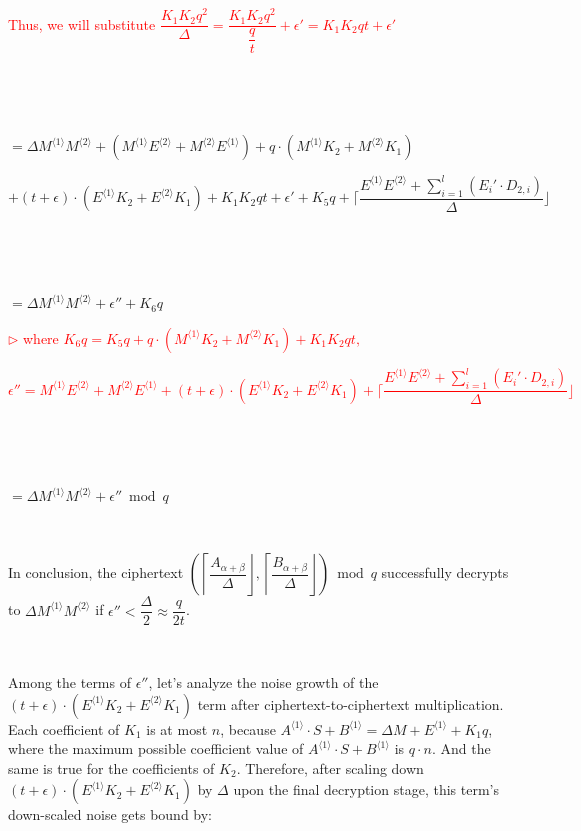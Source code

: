 \text{ } \text{ }  \textcolor{red}{ Thus, we will substitute $\dfrac{K_1K_2q^2}{\Delta} = \dfrac{K_1K_2q^2}{\dfrac{q}{t}} + \epsilon' = K_1K_2qt + \epsilon'$}
 
 $ $

 $ $

$ = \Delta M^{\langle 1 \rangle}M^{\langle 2 \rangle} + (M^{\langle 1 \rangle}E^{\langle 2 \rangle} + M^{\langle 2 \rangle}E^{\langle 1 \rangle}) + q\cdot (M^{\langle 1 \rangle}K_2 +  M^{\langle 2 \rangle}K_1) $

\text{ } \text{ } $+ (t + \epsilon)\cdot(E^{\langle 1 \rangle}K_2 + E^{\langle 2 \rangle}K_1) + K_1K_2qt + \epsilon'   
 + K_5q + \Bigg\lceil\dfrac{E^{\langle 1 \rangle} E^{\langle 2\rangle} + \sum\limits_{i=1}^{l} (E_i'\cdot D_{2,i}) }{\Delta}\Bigg\rfloor $

 $ $

 $ $

$ = \Delta M^{\langle 1 \rangle}M^{\langle 2 \rangle} + \epsilon'' + K_6q$


\textcolor{red}{ $\rhd$ where $K_6q = K_5q + q\cdot(M^{\langle 1 \rangle}K_2 +  M^{\langle 2 \rangle}K_1) + K_1K_2qt, $}

\textcolor{red}{$ \epsilon'' = M^{\langle 1 \rangle}E^{\langle 2 \rangle} + M^{\langle 2 \rangle}E^{\langle 1 \rangle} + (t + \epsilon)\cdot(E^{\langle 1 \rangle}K_2 + E^{\langle 2 \rangle}K_1) + \Bigg\lceil\dfrac{E^{\langle 1 \rangle} E^{\langle 2 \rangle} + \sum\limits_{i=1}^{l} (E_i'\cdot D_{2,i})}{\Delta}\Bigg\rfloor$} 


$ $

$ $


$ = \Delta M^{\langle 1 \rangle}M^{\langle 2 \rangle} + \epsilon'' \bmod q$


$ $

In conclusion, the ciphertext $\left(\left\lceil\dfrac{A_{\alpha+\beta}}{\Delta}\right\rfloor, \left\lceil\dfrac{B_{\alpha+\beta}}{\Delta}\right\rfloor\right) \bmod q$ successfully decrypts to $\Delta M^{\langle 1 \rangle}M^{\langle 2 \rangle}$ if $\epsilon'' < \dfrac{\Delta}{2} \approx \dfrac{q}{2t}$. 

$ $

 Among the terms of $\epsilon''$, let's analyze the noise growth of the $(t + \epsilon)\cdot(E^{\langle 1 \rangle}K_2 + E^{\langle 2 \rangle}K_1)$ term after ciphertext-to-ciphertext multiplication. Each coefficient of $K_1$ is at most $n$, because $A^{\langle 1 \rangle}\cdot S + B^{\langle 1 \rangle} = \Delta M + E^{\langle 1 \rangle} + K_1q$, where the maximum possible coefficient value of $A^{\langle 1 \rangle}\cdot S + B^{\langle 1 \rangle}$ is $q\cdot n$. And the same is true for the coefficients of $K_2$. Therefore, after scaling down $(t + \epsilon)\cdot(E^{\langle 1 \rangle}K_2 + E^{\langle 2 \rangle}K_1)$ by $\Delta$ upon the final decryption stage, this term's down-scaled noise gets bound by: 

